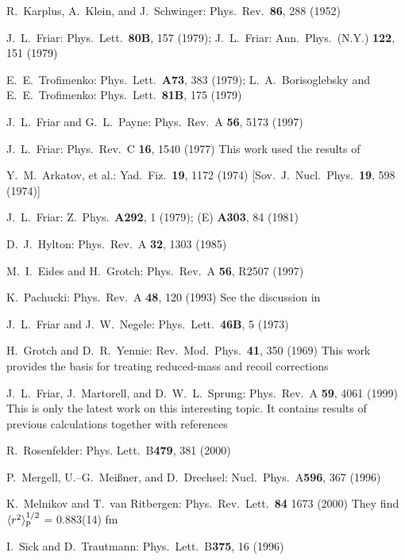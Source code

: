 \documentclass{svmult}
\begin{document}
\begin{thebibliography}{999}
 R.\ Karplus, A.\ Klein, and J.\ Schwinger: Phys.\ Rev.\ {\bf 86},
288 (1952)

 J.\ L.\ Friar: Phys.\ Lett.\ {\bf 80B}, 157 (1979); J.\ L.\ 
Friar: Ann.\ Phys.\ (N.Y.) {\bf 122}, 151 (1979)

 E.\ E.\ Trofimenko: Phys.\ Lett.\ {\bf A73}, 383 (1979); 
L.\ A.\ Borisoglebsky and E.\ E.\ Trofimenko: Phys.\ Lett.\ {\bf 81B}, 175 
(1979)

 J.\ L.\ Friar and G.\ L.\ Payne: Phys.\ Rev.\ A {\bf 56}, 
5173 (1997)

 J.\ L.\ Friar: Phys.\ Rev.\ C {\bf 16}, 1540 (1977) This work 
used the results of \cite{Arkatov}

 Y.\ M.\ Arkatov, et al.: Yad.\ Fiz.\ {\bf 19}, 1172
(1974) [Sov.\ J.\ Nucl.\ Phys.\ {\bf 19}, 598 (1974)]

 J.\ L.\ Friar: Z.\ Phys.\ {\bf A292}, 1 (1979);
(E) {\bf A303}, 84 (1981)

 D.\ J.\ Hylton: Phys.\ Rev.\ A {\bf 32}, 1303 (1985)

 M.\ I.\ Eides and H.\ Grotch: Phys.\ Rev.\ A {\bf 56}, R2507
(1997)

 K.\ Pachucki: Phys.\ Rev.\ A {\bf 48}, 120 (1993) See the 
discussion in \cite{review}

 J.\ L.\ Friar and J.\ W.\ Negele: Phys.\ Lett.\ {\bf 46B}, 5 
(1973)

 H.\ Grotch and D.\ R.\ Yennie: Rev.\ Mod.\ Phys.\ {\bf 41}, 350 
(1969) This work provides the basis for treating reduced-mass and recoil 
corrections

 J.\ L.\ Friar, J.\ Martorell, and D.\ W.\ L.\ Sprung:
Phys.\ Rev.\ A {\bf 59}, 4061 (1999) This is only the latest work on this 
interesting topic. It contains results of previous calculations together with
references

 R.\ Rosenfelder: Phys. Lett.\ B{\bf 479}, 381 (2000)

 P.\ Mergell, U.--G.\ Mei\ss ner, and D.\ Drechsel:
Nucl.\ Phys.\ A{\bf 596}, 367 (1996)

 K.\ Melnikov and T.\ van Ritbergen: Phys.\ Rev.\ Lett.\ {\bf 84}
1673 (2000) They find $\langle r^2 \rangle_{\rm p}^{1/2}$ = 0.883(14) fm

 I.\ Sick and D.\ Trautmann: Phys.\ Lett.\ B{\bf 375}, 16 (1996)


\end{thebibliography}
\end{document}
